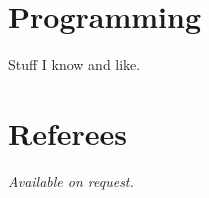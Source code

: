 \documentclass[margin,line]{resume}
\begin{document}
\begin{resume}
    \section{\mysidestyle Programming} 

    Stuff I know and like.

    \section{\mysidestyle Referees} 
    {\sl Available on request.}



\end{resume}
\end{document}
